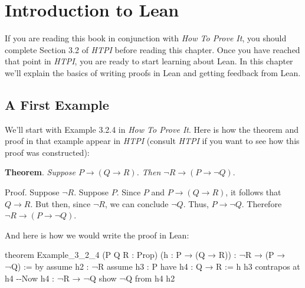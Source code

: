 \documentclass[
  letterpaper,
  DIV=11,
  numbers=noendperiod]{scrreprt}
\newenvironment{Shaded}{\begin{snugshade}}{\end{snugshade}}
\newcommand{\CommentTok}[1]{\textcolor[rgb]{0.37,0.37,0.37}{#1}}
\newcommand{\KeywordTok}[1]{\textcolor[rgb]{0.00,0.23,0.31}{#1}}
\newcommand{\NormalTok}[1]{\textcolor[rgb]{0.00,0.23,0.31}{#1}}
\renewcommand{\NormalTok}[1]{\textcolor[HTML]{000000}{#1}}
\renewcommand{\KeywordTok}[1]{\textcolor[HTML]{0000FF}{#1}}
\renewcommand{\CommentTok}[1]{\textcolor[HTML]{008000}{#1}}
\begin{document}

\hypertarget{introduction-to-lean}{%
\chapter*{Introduction to Lean}\label{introduction-to-lean}}

If you are reading this book in conjunction with \emph{How To Prove It},
you should complete Section 3.2 of \emph{HTPI} before reading this
chapter. Once you have reached that point in \emph{HTPI}, you are ready
to start learning about Lean. In this chapter we'll explain the basics
of writing proofs in Lean and getting feedback from Lean.

\hypertarget{a-first-example}{%
\section*{A First Example}\label{a-first-example}}

We'll start with Example 3.2.4 in \emph{How To Prove It}. Here is how
the theorem and proof in that example appear in \emph{HTPI} (consult
\emph{HTPI} if you want to see how this proof was constructed):

\textbf{Theorem}. \emph{Suppose \(P \to (Q \to R)\). Then
\(\neg R \to (P \to \neg Q)\)}.

Proof. Suppose \(\neg R\). Suppose \(P\). Since \(P\) and
\(P \to (Q \to R)\), it follows that \(Q \to R\). But then, since
\(\neg R\), we can conclude \(\neg Q\). Thus, \(P \to \neg Q\).
Therefore \(\neg R \to (P \to \neg Q)\).

And here is how we would write the proof in Lean:

\begin{Shaded}
\begin{Highlighting}[]
\KeywordTok{theorem}\NormalTok{ Example\_3\_2\_4}
\NormalTok{(P Q R : }\KeywordTok{Prop}\NormalTok{) (h : P → (Q → R)) : ¬R → (P → ¬Q) := }\KeywordTok{by}
  \KeywordTok{assume}\NormalTok{ h2 : ¬R}
  \KeywordTok{assume}\NormalTok{ h3 : P}
  \KeywordTok{have}\NormalTok{ h4 : Q → R := h h3}
  \KeywordTok{contrapos} \KeywordTok{at}\NormalTok{ h4            }\CommentTok{{-}{-}Now h4 : ¬R → ¬Q}
  \KeywordTok{show}\NormalTok{ ¬Q }\KeywordTok{from}\NormalTok{ h4 h2}
\end{Highlighting}
\end{Shaded}
\end{document}
